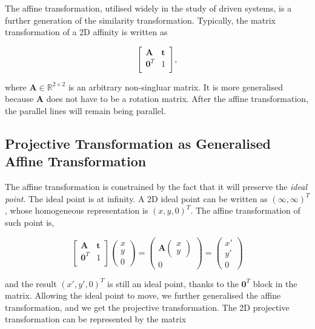 \documentclass[11pt,twoside]{report}
\begin{document}
The affine transformation, utilised widely in the study of driven systems, is a further generation of the similarity transformation. Typically, the matrix transformation of a 2D affinity is written as

$$
\begin{bmatrix}
	\mathbf{A} & \mathbf{t}\\
	\mathbf{0}^T & 1\\
\end{bmatrix},
$$

\noindent where $\mathbf{A} \in \mathbb{R}^{2 \times 2}$ is an arbitrary non-singluar matrix. It is more generalised because $\mathbf{A}$ does not have to be a rotation matrix. After the affine transformation, the parallel lines will remain being parallel.

\subsection{Projective Transformation as Generalised Affine Transformation}

The affine transformation is constrained by the fact that it will preserve the \emph{ideal point}. The ideal point is at infinity. A 2D ideal point can be written as $(\infty, \infty)^T$, whose homogeneous representation is $(x, y, 0)^T$. The affine transformation of such point is,

$$
\begin{bmatrix}
	\mathbf{A} & \mathbf{t}\\
	\mathbf{0}^T & 1\\
\end{bmatrix}
\begin{pmatrix}
	x \\ y \\ 0
\end{pmatrix}
=
\begin{pmatrix}
	\mathbf{A}
	\begin{pmatrix}
		x \\ y
	\end{pmatrix} \\
	0
\end{pmatrix}
= 
\begin{pmatrix}
	x\prime \\ y\prime \\ 0
\end{pmatrix}
$$

\noindent and the result $(x', y', 0)^T$ is still an ideal point, thanks to the $\mathbf{0}^T$ block in the matrix. Allowing the ideal point to move, we further generalised the affine transformation, and we get the projective transformation. The 2D projective transformation can be represented by the matrix
\end{document}

